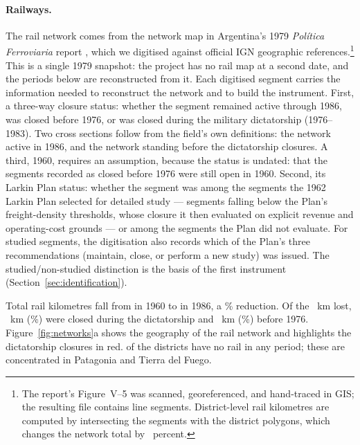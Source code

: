 \paragraph{Railways.}
The rail network comes from the network map in Argentina's 1979
\emph{Política Ferroviaria} report \citep{argentina1981politica},
which we digitised against official IGN geographic
references.\footnote{The report's Figure~V--5 was scanned,
georeferenced, and hand-traced in GIS; the resulting file contains
\railNSegments{} line segments. District-level rail kilometres are
computed by intersecting the segments with the district polygons, which
changes the network total by \railClipLossPct{}~percent.} This is a single
1979 snapshot: the project has no rail map at a second date, and the
periods below are reconstructed from it. Each digitised
segment carries the information needed to reconstruct the network and
to build the instrument. First, a three-way closure status: whether the
segment remained active through 1986, was closed before 1976, or was
closed during the military dictatorship (1976--1983). Two cross sections follow from the field's own
definitions: the network active in 1986, and the network standing before
the dictatorship closures. A third, 1960, requires an assumption,
because the status is undated: that the segments recorded as closed
before 1976 were still open in 1960. Second, its Larkin
Plan status: whether the segment was among the \railNStudied{} segments the
1962 Larkin Plan selected for detailed study --- segments falling
below the Plan's freight-density thresholds, whose closure it then
evaluated on explicit revenue and operating-cost grounds --- or among
the \railNNotStudied{} segments the Plan did not evaluate. For studied segments, the
digitisation also records which of the Plan's three recommendations
(maintain, close, or perform a new study) was issued.
The studied/non-studied distinction is the basis of the first
instrument (Section~\ref{sec:identification}).

Total rail kilometres fall from \railKmSixty{}
in 1960 to \railKmEightySix{} in 1986, a \railPctFall{}\% reduction. Of
the \railKmLost{}~km lost, \railKmDictatorship{}~km
(\railShareDictatorship{}\%) were closed during the dictatorship and
\railKmClosedPreSeventySix{}~km
(\railShareClosedPreSeventySix{}\%) before 1976.
Figure~\ref{fig:networks}a shows the
geography of the rail network and highlights the dictatorship closures
in red. \railNDistrictsNoRail{} of the \nDistricts{} districts have no
rail in any period;
these are concentrated in Patagonia and Tierra del Fuego.


